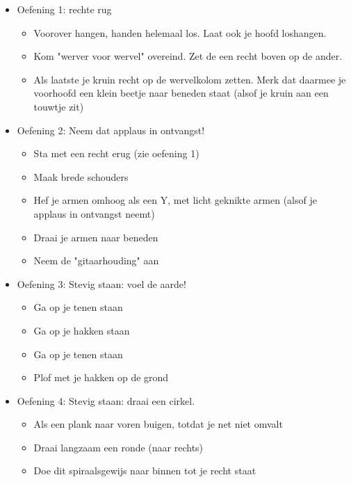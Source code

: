 \begin{itemize}
\item Oefening 1: rechte rug
\begin{itemize} 
\item Voorover hangen, handen helemaal los. Laat ook je hoofd loshangen.
\item Kom "werver voor wervel" overeind. Zet de een recht boven op de ander.
\item Als laatste je kruin recht op de wervelkolom zetten. Merk dat daarmee je voorhoofd een klein beetje naar beneden staat (alsof je kruin aan een touwtje zit)
\end{itemize}
\item Oefening 2: Neem dat applaus in ontvangst!
\begin{itemize} 
\item Sta met een recht erug (zie oefening 1)
\item Maak brede schouders
\item Hef je armen omhoog als een Y, met licht geknikte armen (alsof je applaus in ontvangst neemt)
\item Draai je armen naar beneden
\item Neem de "gitaarhouding" aan
\end{itemize}
\item Oefening 3: Stevig staan: voel de aarde!
\begin{itemize} 
\item Ga op je tenen staan
\item Ga op je hakken staan
\item Ga op je tenen staan
\item Plof met je hakken op de grond
\end{itemize}
\item Oefening 4: Stevig staan: draai een cirkel.
\begin{itemize} 
\item Als een plank naar voren buigen, totdat je net niet omvalt
\item Draai langzaam een ronde (naar rechts)
\item Doe dit spiraalsgewijs naar binnen tot je recht staat
\end{itemize}
\end{itemize}


